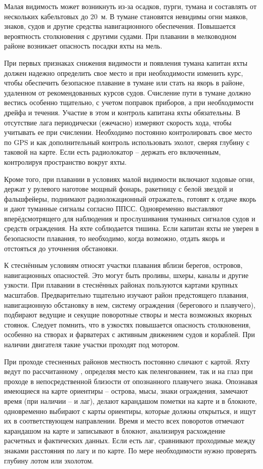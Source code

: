 Малая видимость может возникнуть из-за осадков, пурги, тумана и
составлять от нескольких кабельтовых до 20~м. В тумане
становятся невидимы огни маяков, знаков, судов и другие средства
навигационного обеспечения. Повышается вероятность столкновения с
другими судами. При плавании в мелководном районе возникает опасность
посадки яхты на мель.
 
При первых признаках снижения видимости и появления тумана капитан
яхты должен надежно определить свое место и при необходимости изменить
курс, чтобы обеспечить безопасное плавание в тумане или стать на якорь
в районе, удаленном от рекомендованных курсов судов. Счисление пути в
тумане должно вестись особенно тщательно, с учетом поправок приборов,
а при необходимости дрейфа и течения. Участие в этом и контроль
капитана яхты обязательны. В отсутствие лага периодически (ежечасно)
измеряют скорость хода, чтобы учитывать ее при счислении. Необходимо
постоянно контролировать свое место по GPS и как дополнительный
контроль использовать эхолот, сверяя глубину с таковой на карте. Если
есть радиолокатор \--- держать его включенным, контролируя
пространство вокруг яхты.
 
Кроме того, при плавании в условиях малой видимости включают ходовые
огни, держат у рулевого наготове мощный фонарь, ракетницу с белой
звездой и фальшфейеры, поднимают радиолокационный отражатель, готовят
к отдаче якорь и дают туманные сигналы согласно ППСС. Одновременно
выставляют вперёдсмотрящего для наблюдения и прослушивания туманных
сигналов судов и средств ограждения. На яхте соблюдается тишина. Если
капитан яхты не уверен в безопасности плавания, то необходимо, когда
возможно, отдать якорь и отстояться до уточнения обстановки.
 
К стеснённым условиям относят участки плавания вблизи берегов,
островов, навигационных опасностей. Это могут быть проливы, шхеры,
каналы и другие узкости. При плавании в стеснённых районах пользуются
картами крупных масштабов. Предварительно тщательно изучают район
предстоящего плавания, навигационную обстановку в нем, систему
ограждения (берегового и плавучего), подбирают ведущие и секущие
поворотные створы и места возможных якорных стоянок. Следует помнить,
что в узкостях повышается опасность столкновения, особенно на створах
и фарватерах с активным движением судов и кораблей. При наличии
двигателя такие участки проходят под мотором.

При проходе стесненных районов местность постоянно сличают с
картой. Яхту ведут по рассчитанному \KK, определяя место как
пеленгованием, так и на глаз при проходе в непосредственной близости
от опознанного плавучего знака. Опознавая имеющиеся на карте ориентиры
\--- острова, мысы, знаки ограждения, замечают время (при наличии \---
и лаг), делают карандашом пометки на карте и в блокноте, одновременно
выбирают с карты ориентиры, которые должны открыться, и ищут их в
соответствующем направлении. Время и место всех поворотов отмечают
карандашом на карте и записывают в блокнот, анализируя расхождение
расчетных и фактических данных. Если есть лаг, сравнивают проходимые
между знаками расстояния по лагу и по карте. По мере необходимости
нужно проверять глубину лотом или эхолотом.

